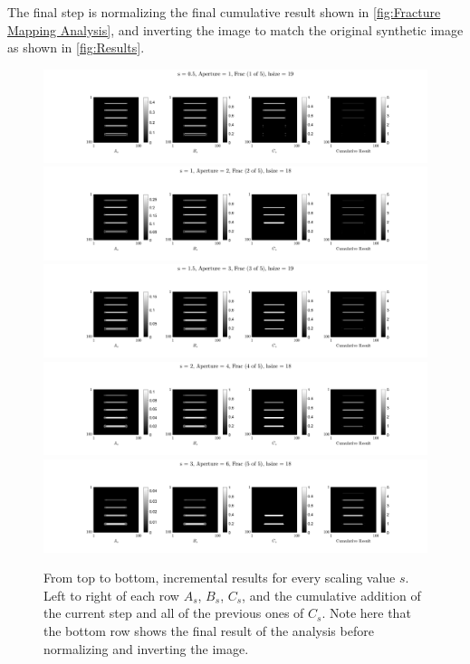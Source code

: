 \documentclass[usletter, 11pt, titlepage]{article}
\begin{document}
The final step is normalizing the final cumulative result shown in \autoref{fig:Fracture Mapping Analysis}, and inverting the image to match the original synthetic image as shown in \autoref{fig:Results}. 

\begin{figure}[!h]
\centering
\includegraphics[width = \textwidth]{"SFI,s = 0.5, Aperture = 1, Frac (1 of 5), hsize = 19"}
\includegraphics[width = \textwidth]{"SFI,s = 1, Aperture = 2, Frac (2 of 5), hsize = 18"}
\includegraphics[width = \textwidth]{"SFI,s = 1.5, Aperture = 3, Frac (3 of 5), hsize = 19"}
\includegraphics[width = \textwidth]{"SFI,s = 2, Aperture = 4, Frac (4 of 5), hsize = 18"}
\includegraphics[width = \textwidth]{"SFI,s = 3, Aperture = 6, Frac (5 of 5), hsize = 18"}
\caption{From top to bottom, incremental results for every scaling value $s$. Left to right of each row $A_s$, $B_s$, $C_s$, and the cumulative addition of the current step and all of the previous ones of $C_s$. Note here that the bottom row shows the final result of the analysis before normalizing and inverting the image. }
\label{fig:Fracture Mapping Analysis}
\end{figure}
\end{document}
